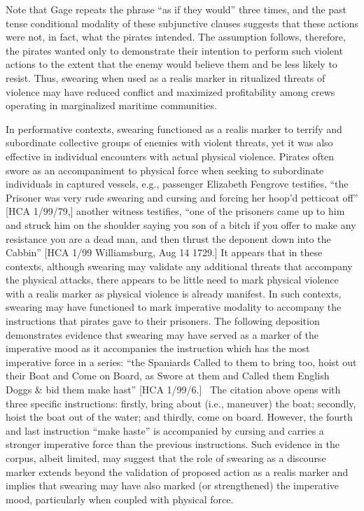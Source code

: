 Note that Gage repeats the phrase “as if they would” three times, and the past tense conditional modality of these subjunctive clauses suggests that these actions were not, in fact, what the pirates intended. The assumption follows, therefore, the pirates wanted only to demonstrate their intention to perform such violent actions to the extent that the enemy would believe them and be less likely to resist. Thus, swearing when used as a realis marker in ritualized threats of violence may have reduced conflict and maximized profitability among crews operating in marginalized maritime communities. 

  In performative contexts, swearing functioned as a realis marker to terrify and subordinate collective groups of enemies with violent threats, yet it was also effective in individual encounters with actual physical violence. Pirates often swore as an accompaniment to physical force when seeking to subordinate individuals in captured vessels, e.g., passenger Elizabeth Fengrove testifies, “the Prisoner was very rude swearing and cursing and forcing her hoop’d petticoat off” [HCA 1/99/79,] another witness testifies, “one of the prisoners came up to him and struck him on the shoulder saying you son of a bitch if you offer to make any resistance you are a dead man, and then thrust the deponent down into the Cabbin” [HCA 1/99 Williamsburg, Aug 14 1729.] It appears that in these contexts, although swearing may validate any additional threats that accompany the physical attacks, there appears to be little need to mark physical violence with a realis marker as physical violence is already manifest. In such contexts, swearing may have functioned to mark imperative modality to accompany the instructions that pirates gave to their prisoners. The following deposition demonstrates evidence that swearing may have served as a marker of the imperative mood as it accompanies the instruction which has the most imperative force in a series: “the Spaniards Called to them to bring too, hoist out their Boat and Come on Board, as Swore at them and Called them English Doggs \& bid them make hast” [HCA 1/99/6.] ~The citation above opens with three specific instructions: firstly, bring about (i.e., maneuver) the boat; secondly, hoist the boat out of the water; and thirdly, come on board. However, the fourth and last instruction “make haste” is accompanied by cursing and carries a stronger imperative force than the previous instructions. Such evidence in the corpus, albeit limited, may suggest that the role of swearing as a discourse marker extends beyond the validation of proposed action as a realis marker and implies that swearing may have also marked (or strengthened) the imperative mood, particularly when coupled with physical force. 

